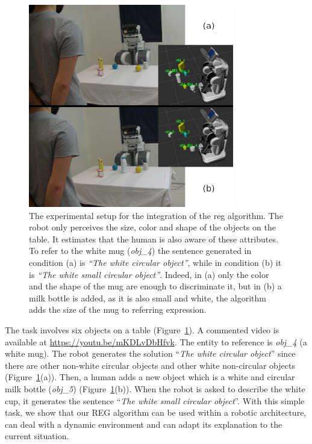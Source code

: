 \documentclass[a4paper,11pt,twoside]{StyleThese}
\begin{document}
\begin{figure}[hbtp]
\centering
\includegraphics[width=0.8\textwidth]{figures/chapter3/REGIntegration.png}
\caption{The experimental setup for the integration of the \acrshort{reg} algorithm. The robot only perceives the size, color and shape of the objects on the table. It estimates that the human is also aware of these attributes. To refer to the white mug (\textit{obj\_4}) the sentence generated in condition (a) is \textit{``The white circular object''}, while in condition (b) it is \textit{``The white small circular object''}. Indeed, in (a) only the color and the shape of the mug are enough to discriminate it, but in (b) a milk bottle is added, as it is also small and white, the algorithm adds the size of the mug to referring expression.}
\label{fig:setupintegrationreg}
\end{figure}

The task involves six objects on a table (Figure~\ref{fig:setupintegrationreg}). A commented video is available at \url{https://youtu.be/mKDLvDbHfvk}. The entity to reference is \textit{obj\_4} (a white mug). The robot generates the solution ``\textit{The white circular object}'' since there are other non-white circular objects and other white non-circular objects (Figure~\ref{fig:setupintegrationreg}(a)). Then, a human adds a new object which is a white and circular milk bottle (\textit{obj\_5}) (Figure~\ref{fig:setupintegrationreg}(b)). When the robot is asked to describe the white cup, it generates the sentence ``\textit{The white small circular object}''. With this simple task, we show that our REG algorithm can be used within a robotic architecture, can deal with a dynamic environment and can adapt its explanation to the current situation.
\end{document}
